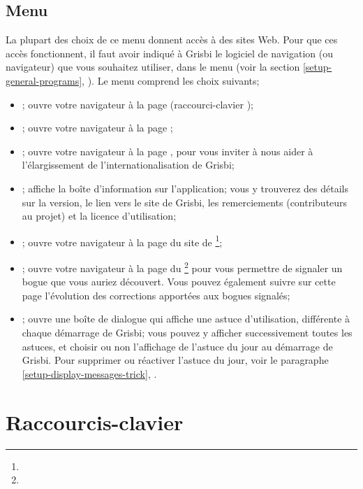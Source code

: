 \subsection{Menu \label{home-menus-help}}

La plupart des choix de ce menu donnent accès à des sites Web. Pour que ces accès fonctionnent, il faut avoir indiqué à Grisbi le logiciel de navigation (ou navigateur) que vous souhaitez utiliser, dans le menu  (voir la section \vref{setup-general-programs}, ). Le menu  comprend les choix suivants;

\begin{itemize}
	\item {}; ouvre votre navigateur à la page  (raccourci-clavier );
	\item {}; ouvre votre navigateur à la page ;
	\item {}; ouvre votre navigateur à la page , pour vous inviter à nous aider à l'élargissement de 	l'internationalisation de Grisbi;
	\item {}; affiche la boîte d'information sur l'application; vous y trouverez des détails sur la version, le lien vers le site de Grisbi, les remerciements (contributeurs au projet) et la licence d'utilisation;
	\item {}; ouvre votre navigateur à la page du site de \footnote{\urlGrisbi{}};
	\item {}; ouvre votre navigateur à la page du \footnote{\urlBugTracker{}} pour vous permettre de signaler un bogue que vous auriez découvert. Vous pouvez également suivre sur cette page l'évolution des corrections apportées aux bogues signalés;
	\item {}; ouvre une boîte de dialogue qui affiche une astuce d'utilisation, différente à chaque démarrage de Grisbi; vous pouvez y 	afficher successivement toutes les astuces, et choisir ou non l'affichage de 	l'astuce du jour au démarrage de Grisbi. Pour supprimer ou réactiver l'astuce du 	jour, voir le paragraphe \vref{setup-display-messages-trick}, .
\end{itemize}


\section{Raccourcis-clavier\label{home-shortcuts}}


